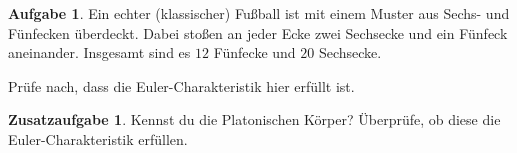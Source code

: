 \documentclass[a4paper,ngerman,12pt]{scrartcl}
\theoremstyle{definition}
\newtheorem{aufg}{Aufgabe}
\newtheorem{zaufg}{Zusatzaufgabe}
\theoremstyle{plain}
\theoremstyle{remark}
\begin{document}
\begin{aufg}
	Ein echter (klassischer) Fußball ist mit einem Muster aus Sechs- und Fünfecken überdeckt. Dabei stoßen an jeder Ecke zwei Sechsecke und ein Fünfeck aneinander. Insgesamt sind es $12$ Fünfecke und $20$ Sechsecke. 
	
	Prüfe nach, dass die Euler-Charakteristik hier erfüllt ist.
\end{aufg}

\begin{zaufg}
	Kennst du die Platonischen Körper? Überprüfe, ob diese die Euler-Charakteristik erfüllen.
\end{zaufg}
\end{document}

